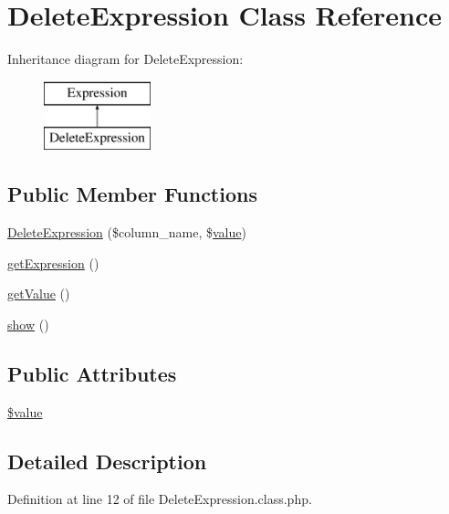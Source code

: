 \hypertarget{classDeleteExpression}{}\section{Delete\+Expression Class Reference}
\label{classDeleteExpression}
Inheritance diagram for Delete\+Expression\+:\begin{figure}[H]
\begin{center}
\leavevmode
\includegraphics[height=2.000000cm]{classDeleteExpression}
\end{center}
\end{figure}
\subsection*{Public Member Functions}
\begin{DoxyCompactItemize}
\item 
\hyperlink{classDeleteExpression_a1749423fab43333921d29c288a5c1b89}{Delete\+Expression} (\$column\+\_\+name, \$\hyperlink{common_2js_2jquery_8js_abe5393d870043cf6aaa1d5ad5fce755c}{value})
\item 
\hyperlink{classDeleteExpression_acf2477afffe27b73797829c852431aec}{get\+Expression} ()
\item 
\hyperlink{classDeleteExpression_a37759c2867e64b62368539706fdf9a43}{get\+Value} ()
\item 
\hyperlink{classDeleteExpression_a6e7d4bdf884830a90e0ed0aba7619f67}{show} ()
\end{DoxyCompactItemize}
\subsection*{Public Attributes}
\begin{DoxyCompactItemize}
\item 
\hyperlink{classDeleteExpression_a8e5b6ee335281d42c6e40a462b83cf64}{\$value}
\end{DoxyCompactItemize}


\subsection{Detailed Description}


Definition at line 12 of file Delete\+Expression.\+class.\+php.




